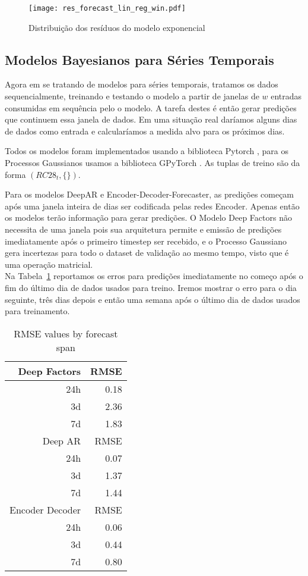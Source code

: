 \begin{figure}[H]
  \label{fig:res_exp}
  \centering
  \texttt{[image: res\_forecast\_lin\_reg\_win.pdf]} \hfill
  \caption{Distribuição dos resíduos do modelo exponencial} 
\end{figure}

\subsection{Modelos Bayesianos para Séries Temporais}


Agora em se tratando de modelos para séries temporais, tratamos os dados
sequencialmente, treinando e testando o modelo a partir de janelas de $w$
entradas consumidas em sequência pelo o modelo. A tarefa destes é então gerar
predições que continuem essa janela de dados. Em uma situação real daríamos
alguns dias de dados como entrada e calcularíamos a medida alvo para os próximos dias. 

Todos os modelos foram implementados usando a biblioteca Pytorch \cite{pytorch}, para os Processos Gaussianos usamos a biblioteca GPyTorch \cite{gpytorch}. As tuplas de treino são da forma $(RC28_{t},\{\})$. 

Para os modelos DeepAR e Encoder-Decoder-Forecaster, as predições começam após
uma janela inteira de dias ser codificada pelas redes Encoder.
Apenas então os modelos terão informação para gerar predições. O Modelo Deep
Factors não necessita de uma janela pois sua arquitetura permite e emissão de
predições imediatamente após o primeiro timestep ser recebido,
e o Processo Gaussiano gera incertezas para todo o dataset de validação ao mesmo tempo, visto que é uma operação matricial. \\

Na Tabela~\ref{tb:rmse} reportamos os erros para predições imediatamente no
começo após o fim do último dia de dados usados para treino. Iremos mostrar o
erro para o dia seguinte, três dias depois e então uma semana após o último dia
de dados usados para treinamento.

\begin{center}
\begin{table}[htbp]
\caption{RMSE values by forecast span}
\centering
\begin{tabular}{rr}
\hline
Deep Factors & RMSE\\
\hline
24h & 0.18\\
3d & 2.36\\
7d & 1.83\\
\hline
Deep AR & RMSE\\
\hline
  24h & 0.07\\
3d & 1.37\\
7d & 1.44\\
\hline
Encoder Decoder & RMSE\\
\hline
24h & 0.06\\
3d & 0.44\\
7d & 0.80\\
\end{tabular}

\label{tb:rmse}
\end{table}
\end{center}

